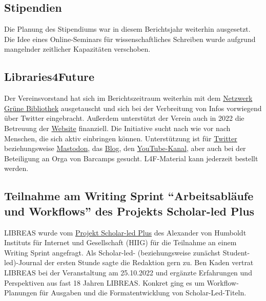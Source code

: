 \documentclass[a4paper,
fontsize=11pt,
oneside,
numbers=noperiodatend,
parskip=half-,
bibliography=totoc,
final
]{scrartcl}
\begin{document}
\hypertarget{stipendien}{%
\subsection{Stipendien}\label{stipendien}}

Die Planung des Stipendiums war in diesem Berichtsjahr weiterhin
ausgesetzt. Die Idee eines Online-Seminars für wissenschaftliches
Schreiben wurde aufgrund mangelnder zeitlicher Kapazitäten verschoben.

\hypertarget{libraries4future}{%
\subsection{Libraries4Future}\label{libraries4future}}

Der Vereinsvorstand hat sich im Berichtszeitraum weiterhin mit dem
\href{https://www.netzwerk-gruene-bibliothek.de/}{Netzwerk Grüne
Bibliothek} ausgetauscht und sich bei der Verbreitung von Infos
vorwiegend über Twitter eingebracht. Außerdem unterstützt der Verein
auch in 2022 die Betreuung der
\href{https://libraries4future.org/}{Website} finanziell. Die Initiative
sucht nach wie vor nach Menschen, die sich aktiv einbringen können.
Unterstützung ist für \href{https://twitter.com/Libraries4F}{Twitter}
beziehungsweise \href{https://climatejustice.global/@libraries4future}{Mastodon},
das \href{https://libraries4future.org/blog/}{Blog}, den
\href{https://www.youtube.com/channel/UC2ugDvNT713LndZuONDt8-A}{YouTube-Kanal},
aber auch bei der Beteiligung an Orga von Barcamps gesucht. L4F-Material
kann jederzeit bestellt werden.

\hypertarget{teilnahme-am-writing-sprint-arbeitsabluxe4ufe-und-workflows-des-projekts-scholar-led-plus}{%
\subsection{\texorpdfstring{Teilnahme am Writing Sprint
\enquote{Arbeitsabläufe und Workflows} des Projekts Scholar-led
Plus}{Teilnahme am Writing Sprint ``Arbeitsabläufe und Workflows'' des Projekts Scholar-led Plus}}\label{teilnahme-am-writing-sprint-arbeitsabluxe4ufe-und-workflows-des-projekts-scholar-led-plus}}

LIBREAS wurde vom
\href{https://www.hiig.de/project/scholar-led-plus/}{Projekt Scholar-led
Plus} des Alexander von Humboldt Instituts für Internet und Gesellschaft
(HIIG) für die Teilnahme an einem Writing Sprint angefragt. Als
Scholar-led- (beziehungsweise zunächst Student-led)-Journal der ersten
Stunde sagte die Redaktion gern zu. Ben Kaden vertrat LIBREAS bei der
Veranstaltung am 25.10.2022 und ergänzte Erfahrungen und Perspektiven
aus fast 18 Jahren LIBREAS. Konkret ging es um Workflow-Planungen für
Ausgaben und die Formatentwicklung von Scholar-Led-Titeln.

\end{document}
